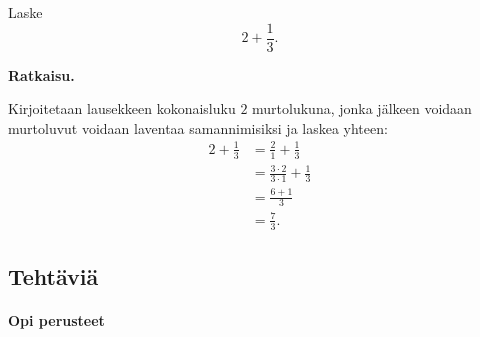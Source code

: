     \begin{esimerkki}
        Laske
        \[
            2 + \frac{1}{3}.
        \]
        
        \textbf{Ratkaisu.}
        
		Kirjoitetaan lausekkeen kokonaisluku $2$ murtolukuna, jonka
		jälkeen voidaan murtoluvut voidaan laventaa samannimisiksi
		ja laskea yhteen:
        \begin{align*}
           2 + \frac{1}{3} &= \frac{2}{1} + \frac{1}{3}  \\ 
	       				   &= \frac{3 \cdot 2}{3 \cdot 1} + \frac{1}{3} \\ 
	       				   &= \frac{6+1}{3} \\ 
	       				   &= \frac{7}{3}.
        \end{align*}
    \end{esimerkki}
    

    

\subsection*{Tehtäviä}

\paragraph*{Opi perusteet}

